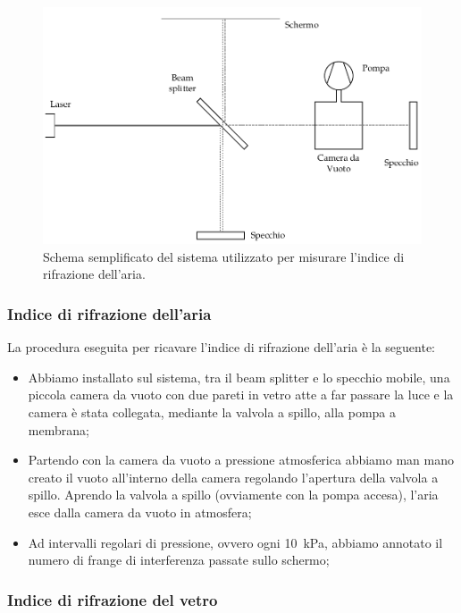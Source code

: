 

\begin{figure}
    \centering
    \includegraphics[width=120mm]{drawing.pdf}
    \caption{Schema semplificato del sistema utilizzato per misurare l'indice di rifrazione dell'aria.}
    \label{fig:mik}
\end{figure}

\subsubsection{Indice di rifrazione dell'aria}

La procedura eseguita per ricavare l'indice di rifrazione dell'aria è la seguente:

\begin{itemize}
	\item{Abbiamo installato sul sistema, tra il beam splitter e lo specchio mobile, una piccola camera da vuoto con due pareti in vetro atte a far passare la luce %
	 e la camera è stata collegata, mediante la valvola a spillo, alla pompa a membrana;}
    \item{Partendo con la camera da vuoto a pressione atmosferica abbiamo man mano creato il vuoto all'interno della camera regolando l'apertura della valvola a spillo. Aprendo la valvola a spillo (ovviamente con la pompa accesa), l'aria esce dalla camera da vuoto in atmosfera;}
    \item{Ad intervalli regolari di pressione, ovvero ogni \SI{10}{\kilo\pascal}, abbiamo annotato il numero di frange di interferenza passate sullo schermo;}
\end{itemize}

\subsubsection{Indice di rifrazione del vetro}


